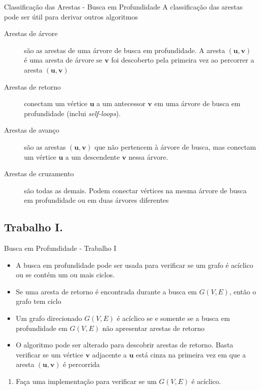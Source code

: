 \documentclass[xcolor=table]{beamer}
\begin{document}
\begin{frame}{Classificação das Arestas - Busca em Profundidade}
  A classificação das arestas pode ser útil para derivar outros algoritmos
  \begin{description}
    \item[Arestas de árvore] são as arestas de uma árvore de busca em profundidade. A aresta $\mathbf{(u,v)}$ é uma aresta de árvore se $\mathbf{v}$ foi descoberto pela primeira vez ao percorrer a aresta $\mathbf{(u,v)}$
    \item[Arestas de retorno] conectam um vértice $\mathbf{u}$ a um antecessor $\mathbf{v}$ em uma árvore de busca em profundidade (inclui \textit{self-loops}).
    \item[Arestas de avanço] são as arestas $\mathbf{(u,v)}$ que não pertencem à árvore de busca, mas conectam um vértice $\mathbf{u}$ a um descendente $\mathbf{v}$ nessa árvore.
    \item[Arestas de cruzamento] são todas as demais. Podem conectar vértices na mesma árvore de busca em profundidade ou em duas árvores diferentes
  \end{description}
\end{frame}

\subsection{Trabalho I.}
\begin{frame}{Busca em Profundidade - Trabalho I}
  \begin{block}{}
    \begin{itemize}
      \item A busca em profundidade pode ser usada para verificar se um grafo é acíclico ou se contém um ou mais ciclos.
      \item Se uma aresta de retorno é encontrada durante a busca em $G(V,E)$, então o grafo tem ciclo
      \item Um grafo direcionado $G(V,E)$ é acíclico se e somente se a busca em profundidade em $G(V,E)$ não apresentar arestas de retorno
      \item O algoritmo pode ser alterado para descobrir arestas de retorno. Basta verificar se um vértice $\mathbf{v}$ adjacente a $\mathbf{u}$ está cinza na primeira vez em que a aresta $\mathbf{(u,v)}$ é percorrida
    \end{itemize}
    \begin{enumerate}
      \item Faça uma implementação para verificar se um $G(V,E)$ é acíclico.
    \end{enumerate}
  \end{block}
\end{frame}
\end{document}
